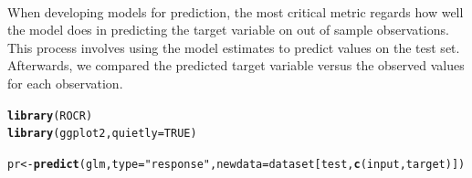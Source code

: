 \documentclass{article}\usepackage[]{graphicx}\usepackage[]{color}
\makeatletter
\newcommand{\hlnum}[1]{\textcolor[rgb]{0.686,0.059,0.569}{#1}}%
\newcommand{\hlstr}[1]{\textcolor[rgb]{0.192,0.494,0.8}{#1}}%
\newcommand{\hlstd}[1]{\textcolor[rgb]{0.345,0.345,0.345}{#1}}%
\newcommand{\hlkwb}[1]{\textcolor[rgb]{0.69,0.353,0.396}{#1}}%
\newcommand{\hlkwc}[1]{\textcolor[rgb]{0.333,0.667,0.333}{#1}}%
\newcommand{\hlkwd}[1]{\textcolor[rgb]{0.737,0.353,0.396}{\textbf{#1}}}%
\newenvironment{kframe}{%
 \def\at@end@of@kframe{}%
 \ifinner\ifhmode%
  \def\at@end@of@kframe{\end{minipage}}%
  \begin{minipage}{\columnwidth}%
 \fi\fi%
 \def\FrameCommand##1{\hskip\@totalleftmargin \hskip-\fboxsep
 \colorbox{shadecolor}{##1}\hskip-\fboxsep
     \hskip-\linewidth \hskip-\@totalleftmargin \hskip\columnwidth}%
 \MakeFramed {\advance\hsize-\width
   \@totalleftmargin\z@ \linewidth\hsize
   \@setminipage}}%
 {\par\unskip\endMakeFramed%
 \at@end@of@kframe}
\newenvironment{knitrout}{}{} %
\makeatother
\begin{document}
\\ When developing models for prediction, the most critical metric regards how well the model does in predicting the target variable on out of sample observations. This process involves using the model estimates to predict values on the test set. Afterwards, we compared the predicted target variable versus the observed values for each observation.
\begin{knitrout}
\color{fgcolor}\begin{kframe}
\begin{alltt}
\hlkwd{library}\hlstd{(ROCR)}
\hlkwd{library}\hlstd{(ggplot2,} \hlkwc{quietly}\hlstd{=}\hlnum{TRUE}\hlstd{)}

\hlstd{pr} \hlkwb{<-} \hlkwd{predict}\hlstd{(glm,} \hlkwc{type}\hlstd{=}\hlstr{"response"}\hlstd{,} \hlkwc{newdata}\hlstd{=dataset[test,} \hlkwd{c}\hlstd{(input, target)])}
\end{alltt}
\end{kframe}
\end{knitrout}
\end{document}
